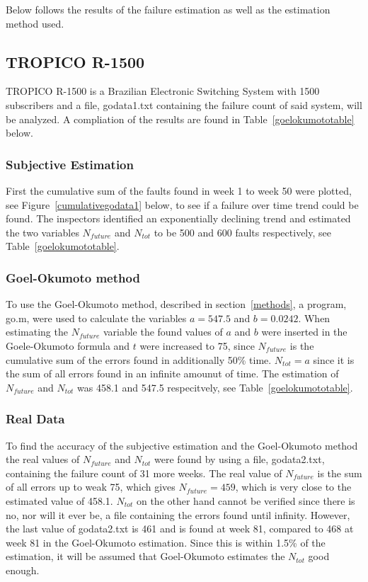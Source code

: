 Below follows the results of the failure estimation as well as the estimation method used.

\subsection{TROPICO R-1500}
TROPICO R-1500 is a Brazilian Electronic Switching System with 1500 subscribers and a file, godata1.txt containing the failure count of said system, will be analyzed. A compliation of the results are found in Table~\ref{goelokumototable} below.
\subsubsection*{Subjective Estimation} 
First the cumulative sum of the faults found in week 1 to week 50 were plotted, see Figure~\ref{cumulativegodata1} below, to see if a failure over time trend could be found.
The inspectors identified an exponentially declining trend and estimated the two variables $N_{future}$ and $N_{tot}$ to be 500 and 600 faults respectively, see Table~\ref{goelokumototable}. 
\subsubsection*{Goel-Okumoto method}
To use the Goel-Okumoto method, described in section~\ref{methods}, a program, go.m, were used to calculate the variables $a=547.5$ and $b=0.0242$.
When estimating the $N_{future}$ variable the found values of $a$ and $b$ were inserted in the Goele-Okumoto formula and $t$ were increased to 75, since $N_{future}$ is the cumulative sum of the errors found in additionally 50\% time. 
$N_{tot} = a$ since it is the sum of all errors found in an infinite amounut of time.
The estimation of $N_{future}$ and $N_{tot}$ was 458.1 and 547.5 respecitvely, see Table~\ref{goelokumototable}.
\subsubsection*{Real Data}
To find the accuracy of the subjective estimation and the Goel-Okumoto method the real values of $N_{future}$ and $N_{tot}$ were found by using a file, godata2.txt, containing the failure count of 31 more weeks. 
The real value of $N_{future}$ is the sum of all errors up to weak 75, which gives $N_{future}=459$, which is very close to the estimated value of 458.1. $N_{tot}$ on the other hand cannot be verified since there is no, nor will it ever be, a file containing the errors found until infinity. However, the last value of godata2.txt is 461 and is found at week 81, compared to 468 at week 81 in the Goel-Okumoto estimation. Since this is within 1.5\% of the estimation, it will be assumed that Goel-Okumoto estimates the $N_{tot}$ good enough.

